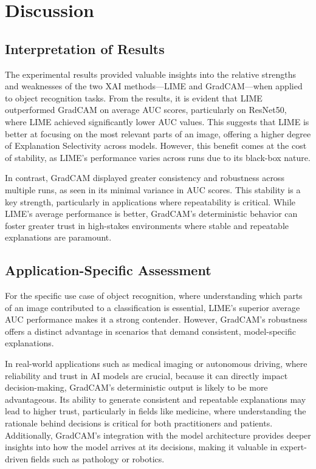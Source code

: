 \documentclass{article}
\begin{document}
\section{Discussion}
\subsection{Interpretation of Results}
The experimental results provided valuable insights into the relative strengths and weaknesses of the two XAI methods—LIME and GradCAM—when applied to object recognition tasks. From the results, it is evident that LIME outperformed GradCAM on average AUC scores, particularly on ResNet50, where LIME achieved significantly lower AUC values. This suggests that LIME is better at focusing on the most relevant parts of an image, offering a higher degree of Explanation Selectivity across models. However, this benefit comes at the cost of stability, as LIME’s performance varies across runs due to its black-box nature.

In contrast, GradCAM displayed greater consistency and robustness across multiple runs, as seen in its minimal variance in AUC scores. This stability is a key strength, particularly in applications where repeatability is critical. While LIME’s average performance is better, GradCAM’s deterministic behavior can foster greater trust in high-stakes environments where stable and repeatable explanations are paramount.


\subsection{Application-Specific Assessment}
For the specific use case of object recognition, where understanding which parts of an image contributed to a classification is essential,  LIME’s superior average AUC performance makes it a strong contender. However, GradCAM’s robustness offers a distinct advantage in scenarios that demand consistent, model-specific explanations.

In real-world applications such as medical imaging or autonomous driving, where reliability and trust in AI models are crucial, because it can directly impact decision-making, GradCAM’s deterministic output is likely to be more advantageous. Its ability to generate consistent and repeatable explanations may lead to higher trust, particularly in fields like medicine, where understanding the rationale behind decisions is critical for both practitioners and patients. Additionally, GradCAM’s integration with the model architecture provides deeper insights into how the model arrives at its decisions, making it valuable in expert-driven fields such as pathology or robotics.
\end{document}
